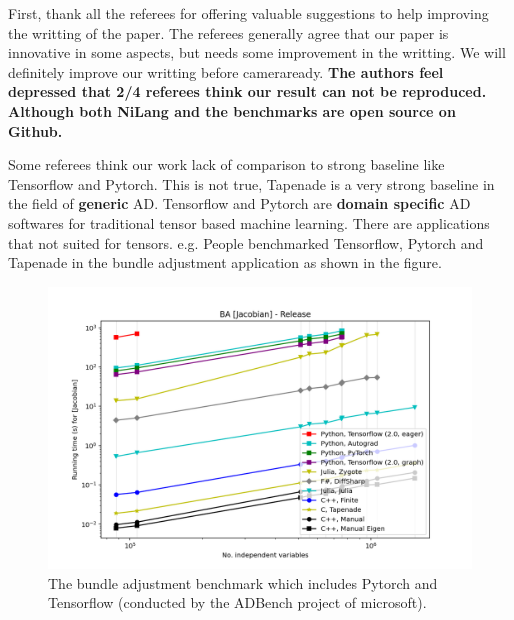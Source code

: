 \documentclass{article}
\begin{document}
First, thank all the referees for offering valuable suggestions to help improving the writting of the paper.
The referees generally agree that our paper is innovative in some aspects, but needs some improvement in the writting.
We will definitely improve our writting before cameraready.
\textbf{The authors feel depressed that 2/4 referees think our result can not be reproduced. Although both NiLang and the benchmarks are open source on Github.}

Some referees think our work lack of comparison to strong baseline like Tensorflow and Pytorch.
This is not true, Tapenade is a very strong baseline in the field of \textbf{generic} AD.
Tensorflow and Pytorch are \textbf{domain specific} AD softwares for traditional tensor based machine learning.
There are applications that not suited for tensors.
e.g. People benchmarked Tensorflow, Pytorch and Tapenade in the bundle adjustment application as shown in the figure.

\begin{figure}
    \centerline{\includegraphics[width=0.5\columnwidth,trim={0 0cm 0 0cm},clip]{ba-jacobian-adbench.png}}
    \caption{The bundle adjustment benchmark which includes Pytorch and Tensorflow (conducted by the ADBench project of microsoft).}\label{bench-ba}
\end{figure}
\end{document}
